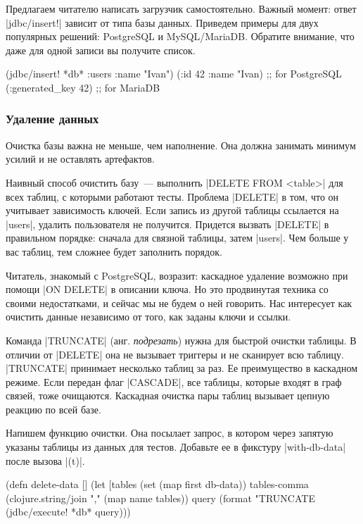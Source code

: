 Предлагаем читателю написать загрузчик самостоятельно. Важный момент: ответ
\spverb|jdbc/insert!| зависит от типа базы данных. Приведем примеры для двух
популярных решений: PostgreSQL и MySQL/MariaDB. Обратите внимание, что даже для
одной записи вы получите список.

\begin{english}
  \begin{clojure}
(jdbc/insert! *db* :users {:name "Ivan"})
({:id 42 :name "Ivan}) ;; for PostgreSQL
({:generated_key 42})  ;; for MariaDB
  \end{clojure}
\end{english}

\subsubsection*{Удаление данных}

Очистка базы важна не меньше, чем наполнение. Она должна занимать минимум усилий
и не оставлять артефактов.

Наивный способ очистить базу~--- выполнить \spverb|DELETE FROM <table>| для всех
таблиц, с которыми работают тесты. Проблема \spverb|DELETE| в том, что он
учитывает зависимость ключей. Если запись из другой таблицы ссылается на
\spverb|users|, удалить пользователя не получится. Придется вызвать
\spverb|DELETE| в правильном порядке: сначала для связной таблицы, затем
\spverb|users|. Чем больше у вас таблиц, тем сложнее будет заполнить порядок.

Читатель, знакомый с PostgreSQL, возразит: каскадное удаление возможно при
помощи \spverb|ON DELETE| в описании ключа. Но это продвинутая техника со своими
недостатками, и сейчас мы не будем о ней говорить. Нас интересует как очистить
данные независимо от того, как заданы ключи и ссылки.

Команда \spverb|TRUNCATE| (анг. \emph{подрезать}) нужна для быстрой очистки
таблицы. В отличии от \spverb|DELETE| она не вызывает триггеры и не сканирует
всю таблицу. \spverb|TRUNCATE| принимает несколько таблиц за раз. Ее
преимущество в каскадном режиме. Если передан флаг \spverb|CASCADE|, все
таблицы, которые входят в граф связей, тоже очищаются. Каскадная очистка пары
таблиц вызывает цепную реакцию по всей базе.

Напишем функцию очистки. Она посылает запрос, в котором через запятую указаны
таблицы из данных для тестов. Добавьте ее в фикстуру \spverb|with-db-data| после
вызова \spverb|(t)|.

\begin{english}
  \begin{clojure}
(defn delete-data []
  (let [tables (set (map first db-data))
        tables-comma (clojure.string/join "," (map name tables))
        query (format "TRUNCATE %
    (jdbc/execute! *db* query)))
  \end{clojure}
\end{english}

